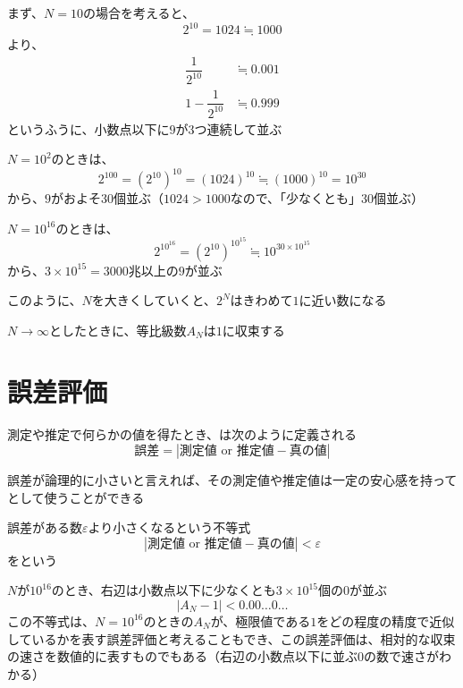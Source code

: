 \documentclass[../book_jiriki_calc]{subfiles}
\begin{document}
まず、$N=10$の場合を考えると、
\begin{equation}
  2^{10} = 1024 \fallingdotseq 1000
\end{equation}
より、
\begin{align}
  \dfrac{1}{2^{10}}     & \fallingdotseq 0.001 \\
  1 - \dfrac{1}{2^{10}} & \fallingdotseq 0.999
\end{align}
というふうに、小数点以下に$9$が3つ連続して並ぶ

$N=10^2$のときは、
\begin{equation}
  2^{100} = (2^{10})^{10} = (1024)^{10} \fallingdotseq (1000)^{10} = 10^{30}
\end{equation}
から、$9$がおよそ30個並ぶ（$1024 > 1000$なので、「少なくとも」30個並ぶ）

$N=10^{16}$のときは、
\begin{equation}
  2^{10^{16}} = (2^{10})^{10^{15}} \fallingdotseq 10^{30 \times 10^{15}}
\end{equation}
から、$3 \times 10^{15} = 3000$兆以上の$9$が並ぶ

このように、$N$を大きくしていくと、$2^N$はきわめて$1$に近い数になる

$N \to \infty$としたときに、等比級数$A_N$は$1$に収束する

\section{誤差評価}

測定や推定で何らかの値を得たとき、は次のように定義される
\begin{equation}
  \text{誤差} = \left| \text{測定値 or 推定値} - \text{真の値} \right|
\end{equation}

誤差が論理的に小さいと言えれば、その測定値や推定値は一定の安心感を持ってとして使うことができる

\br

誤差がある数$\varepsilon$より小さくなるという不等式
\begin{equation}
  \left| \text{測定値 or 推定値} - \text{真の値} \right| < \varepsilon
\end{equation}
をという

\br

$N$が$10^{16}$のとき、右辺は小数点以下に少なくとも$3\times 10^{15}$個の$0$が並ぶ
\begin{equation}
  \left| A_N - 1 \right| < 0.00\ldots 0 \ldots
\end{equation}
この不等式は、$N=10^{16}$のときの$A_N$が、極限値である$1$をどの程度の精度で近似しているかを表す誤差評価と考えることもでき、この誤差評価は、相対的な収束の速さを数値的に表すものでもある（右辺の小数点以下に並ぶ$0$の数で速さがわかる）
\end{document}
